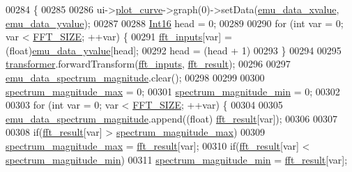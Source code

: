 \begin{DoxyCode}
00284                                    \{
00285 
00286      ui->\hyperlink{a00026_a1d46308dee8db7e3c99af65f13055479}{plot\_curve}->graph(0)->setData(\hyperlink{a00004_a66d07ec51f26cd9b84994548faa336d6}{emu\_data\_xvalue}, 
      \hyperlink{a00004_ad922d05d1e988d84f404c115fe909f72}{emu\_data\_yvalue});
00287 
00288      \hyperlink{a00001_a3985266aecb120f269789241c170850c}{Int16} head = 0;
00289 
00290      \textcolor{keywordflow}{for} (\textcolor{keywordtype}{int} var = 0; var < \hyperlink{a00036_a636ddc19af00bc87969a07c88331f105}{FFT\_SIZE}; ++var) \{
00291          \hyperlink{a00004_a8782fc20094d65d56c04869b9692902e}{fft\_inputs}[var] = (float)\hyperlink{a00004_ad922d05d1e988d84f404c115fe909f72}{emu\_data\_yvalue}[head];
00292          head = (head + 1)%
00293      \}
00294 
00295      \hyperlink{a00004_a0d6e12337ef942452edea37827e58cd4}{transformer}.forwardTransform(\hyperlink{a00004_a8782fc20094d65d56c04869b9692902e}{fft\_inputs}, \hyperlink{a00004_a63b6150bfbba86ba943877a2f547ddd8}{fft\_result});
00296 
00297      \hyperlink{a00004_ac3c515466f79ab8e60a58e8d15a3b991}{emu\_data\_spectrum\_magnitude}.clear();
00298 
00299 
00300      \hyperlink{a00004_ae0119c7dd2179cdcb3ea37adbefdc289}{spectrum\_magnitude\_max} = 0;
00301      \hyperlink{a00004_afb692cc49c350d4bf120ca1e3dd61e93}{spectrum\_magnitude\_min} = 0;
00302 
00303      \textcolor{keywordflow}{for} (\textcolor{keywordtype}{int} var = 0; var < \hyperlink{a00036_a636ddc19af00bc87969a07c88331f105}{FFT\_SIZE}; ++var) \{
00304 
00305          \hyperlink{a00004_ac3c515466f79ab8e60a58e8d15a3b991}{emu\_data\_spectrum\_magnitude}.append((\textcolor{keywordtype}{float})
      \hyperlink{a00004_a63b6150bfbba86ba943877a2f547ddd8}{fft\_result}[var]);
00306 
00307 
00308          \textcolor{keywordflow}{if}(\hyperlink{a00004_a63b6150bfbba86ba943877a2f547ddd8}{fft\_result}[var] > \hyperlink{a00004_ae0119c7dd2179cdcb3ea37adbefdc289}{spectrum\_magnitude\_max})
00309              \hyperlink{a00004_ae0119c7dd2179cdcb3ea37adbefdc289}{spectrum\_magnitude\_max} = \hyperlink{a00004_a63b6150bfbba86ba943877a2f547ddd8}{fft\_result}[var];
00310          \textcolor{keywordflow}{if}(\hyperlink{a00004_a63b6150bfbba86ba943877a2f547ddd8}{fft\_result}[var] < \hyperlink{a00004_afb692cc49c350d4bf120ca1e3dd61e93}{spectrum\_magnitude\_min})
00311              \hyperlink{a00004_afb692cc49c350d4bf120ca1e3dd61e93}{spectrum\_magnitude\_min} = \hyperlink{a00004_a63b6150bfbba86ba943877a2f547ddd8}{fft\_result}[var];

\end{DoxyCode}

